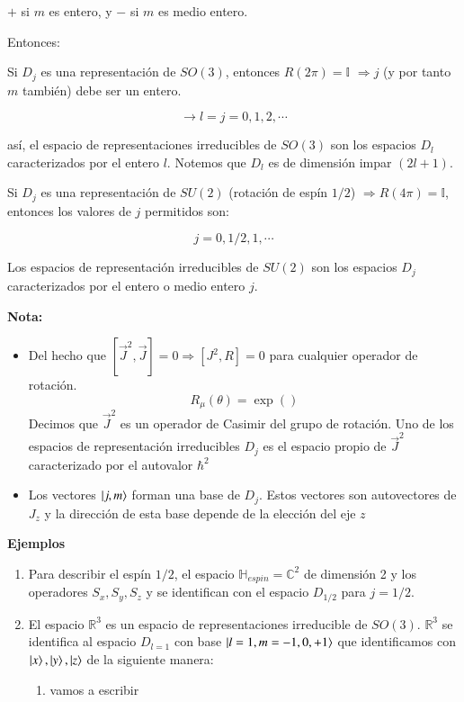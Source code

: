 $+$ si $m$ es entero, y $-$ si $m$ es medio entero.

Entonces:

Si $D_j$ es una representación de $SO(3)$, entonces $R(2\pi)=\mathbb{I}$ $\Rightarrow j$ (y por tanto $m$ también) debe ser un entero.

$$
\rightarrow l=j=0,1,2,\cdots
$$

así, el espacio de representaciones irreducibles de $SO(3)$ son los espacios $D_l$ caracterizados por el entero $l$. Notemos que $D_l$ es de dimensión impar $(2l+1)$.

Si $D_j$ es una representación de $SU(2)$ (rotación de espín $1/2$) $\Rightarrow R(4\pi)=\mathbb{I}$, entonces los valores de $j$ permitidos son:

$$
j=0,1/2,1,\cdots
$$

Los espacios de representación irreducibles de $SU(2)$ son los espacios $D_j$ caracterizados por el entero o medio entero $j$.

\textbf{Nota:}
\begin{itemize}
    \item Del hecho que $\left[\vec{J}^2,\vec{J}\right]=0\Rightarrow\left[J^2,R\right]=0$ para cualquier operador de rotación.
    $$
    R_\mu (\theta)=\exp()
    $$
    Decimos que $\vec{J}^2$ es un operador de Casimir del grupo de rotación.
    Uno de los espacios de representación irreducibles $D_j$ es el espacio propio de $\vec{J}^2$ caracterizado por el autovalor $\hbar^2 $

    \item Los vectores $\ket{j,m}$ forman una base de $D_j$. Estos vectores son autovectores de $J_z$ y la dirección de esta base depende de la elección del eje $z$
\end{itemize}

\textbf{Ejemplos}

\begin{enumerate}
    \item Para describir el espín $1/2$, el espacio $\mathbb{H}_{espin}=\mathbb{C}^2$ de dimensión 2 y los operadores $S_x,S_y,S_z$ y se identifican con el espacio $D_{1/2}$ para $j=1/2$.
    \item El espacio $\mathbb{R}^3$ es un espacio de representaciones irreducible de $SO(3)$. $\mathbb{R}^3$ se identifica al espacio $D_{l=1}$ con base $\ket{l=1,m=-1,0,+1}$ que identificamos con $\ket{x},\ket{y},\ket{z}$ de la siguiente manera:
    \begin{enumerate}
        \item vamos a escribir
    \end{enumerate}
\end{enumerate}


